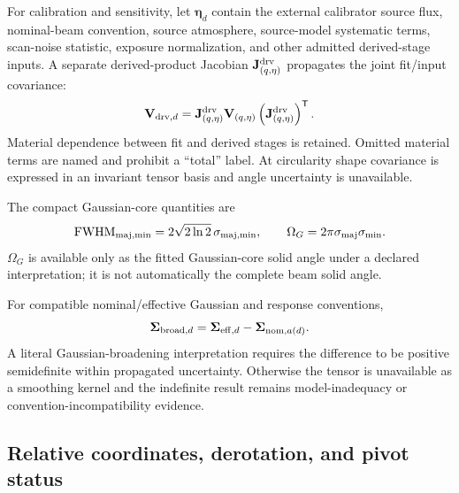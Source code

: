 For calibration and sensitivity, let $\boldsymbol\eta_d$ contain the external
calibrator source flux, nominal-beam convention, source atmosphere,
source-model systematic terms, scan-noise statistic, exposure normalization,
and other admitted derived-stage inputs. A separate derived-product Jacobian
$\mathbf J^{\rm drv}_{(q,\eta)}$ propagates the joint fit/input covariance:
\begin{equation}
\mathbf V_{{\rm drv},d}=\mathbf J^{\rm drv}_{(q,\eta)}
\mathbf V_{(q,\eta)}
\left(\mathbf J^{\rm drv}_{(q,\eta)}\right)^\mathsf T .
\label{eq:nuisance}
\end{equation}
Material dependence between fit and derived stages is retained.
Omitted material terms are named and prohibit a ``total'' label. At
circularity shape covariance is expressed in an invariant tensor basis and
angle uncertainty is unavailable.

The compact Gaussian-core quantities are
\begin{equation}
{\rm FWHM}_{\rm maj,min}=2\sqrt{2\ln2}\,\sigma_{\rm maj,min},
\qquad
\Omega_G=2\pi\sigma_{\rm maj}\sigma_{\rm min}.
\label{eq:fwhm-area}
\end{equation}
$\Omega_G$ is available only as the fitted Gaussian-core solid angle under a
declared interpretation; it is not automatically the complete beam solid
angle.

For compatible nominal/effective Gaussian and response conventions,
\begin{equation}
\boldsymbol\Sigma_{{\rm broad},d}=
\boldsymbol\Sigma_{{\rm eff},d}-\boldsymbol\Sigma_{{\rm nom},a(d)} .
\label{eq:broadening}
\end{equation}
A literal Gaussian-broadening interpretation requires the difference to be
positive semidefinite within propagated uncertainty. Otherwise the tensor is
unavailable as a smoothing kernel and the indefinite result remains
model-inadequacy or convention-incompatibility evidence.

\subsection{Relative coordinates, derotation, and pivot status}

